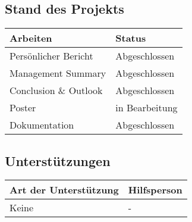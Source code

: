 \subsection*{Stand des Projekts}
\begin{table}[H]
    \centering
    \begin{tabular}{p{12cm} p{4cm}}
        \textbf{Arbeiten} & \textbf{Status} \\ \hline
        Persönlicher Bericht & Abgeschlossen \\ \hline
        Management Summary & Abgeschlossen \\ \hline
        Conclusion \& Outlook & Abgeschlossen \\ \hline
        Poster & in Bearbeitung \\ \hline
        Dokumentation & Abgeschlossen \\ \hline
    \end{tabular}
\end{table}

\vspace{1cm}

\subsection*{Unterstützungen}
\begin{table}[H]
    \centering
    \begin{tabular}{p{12cm} p{4cm}}
        \textbf{Art der Unterstützung} & \textbf{Hilfsperson} \\ \hline
        Keine & - \\ \hline
    \end{tabular}
\end{table}

\vspace{1cm}

